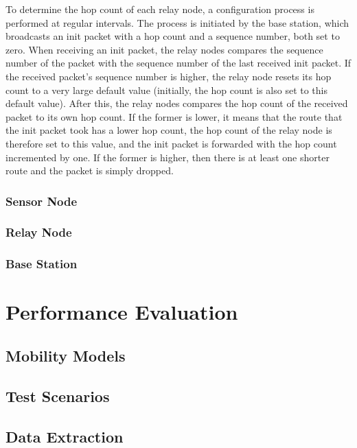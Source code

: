 \documentclass[conference]{IEEEtran}
\begin{document}
To determine the hop count of each relay node, a configuration process is
performed at regular intervals. The process is initiated by the base station,
which broadcasts an init packet with a hop count and a sequence number, both
set to zero. When receiving an init packet, the relay nodes compares the
sequence number of the packet with the sequence number of the last received
init packet. If the received packet's sequence number is higher, the relay node
resets its hop count to a very large default value (initially, the hop count is
also set to this default value). After this, the relay nodes compares the hop
count of the received packet to its own hop count. If the former is lower, it
means that the route that the init packet took has a lower hop count, the hop
count of the relay node is therefore set to this value, and the init packet is
forwarded with the hop count incremented by one. If the former is higher, then
there is at least one shorter route and the packet is simply dropped.

\subsubsection{Sensor Node}

\subsubsection{Relay Node}

\subsubsection{Base Station}



\section{Performance Evaluation}

\subsection{Mobility Models}

\subsection{Test Scenarios}

\subsection{Data Extraction} 
\end{document}

